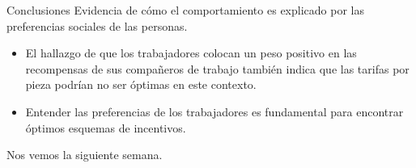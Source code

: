 \documentclass[11pt, aspectratio=169, compress]{beamer}
\makeatletter
\def\beamer@writeslidentry@miniframesoff{%
	\expandafter\beamer@ifempty\expandafter{\beamer@framestartpage}{}%
	{%
		\clearpage\beamer@notesactions%
	}
}
\newcommand*{\miniframesoff}{\let\beamer@writeslidentry=\beamer@writeslidentry@miniframesoff}
\makeatother
\begin{document}
\begin{frame}{Conclusiones}
Evidencia de cómo el comportamiento es explicado por las preferencias sociales de las personas. 
\begin{itemize}
	\item El hallazgo de que los trabajadores colocan un peso positivo en las recompensas de sus compañeros de trabajo también indica que las tarifas por pieza podrían no ser óptimas en este contexto. 
	\item Entender las preferencias de los trabajadores es fundamental para encontrar óptimos esquemas de incentivos. 
\end{itemize}
\end{frame}

\miniframesoff 	
\begin{frame}
Nos vemos la siguiente semana. 
\end{frame}
\end{document}
